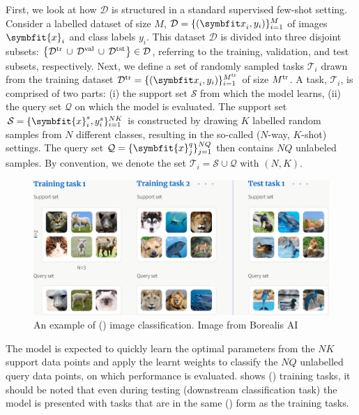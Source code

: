 First, we look at how \(\mathcal{D}\) is structured in a standard supervised few-shot setting. 
Consider a labelled dataset of size $M$, $\mathcal{D} = \{({\symbfit x}_i, y_i)\}_{i = 1}^{M}$ of images $\symbfit{x}_i$ and class labels $y_i$. 
This dataset $\mathcal{D}$ is divided into three disjoint subsets: $\left\{\mathcal{D}^\textup{tr}\, \cup\, \mathcal{D}^\textup{val}\, \cup\, \mathcal{D}^\textup{tst}\right\} \in \mathcal{D}$, referring to the training, validation, and test subsets, respectively.
Next, we define a set of randomly sampled tasks $\mathcal{T}_i$ drawn from the training dataset $\mathcal{D}^{\textup{tr}} = \{({\symbfit x}_i, y_i)\}_{i = 1}^{M^\textup{tr}}$ of size $M^\textup{tr}$. A task, $\mathcal{T}_i$, is comprised of two parts: (i) the support set $\mathcal{S}$ from which the model learns, (ii) the query set $\mathcal{Q}$ on which the model is evaluated. The support set $\mathcal{S}=\{\symbfit{x}^{s}_i, y^{s}_i\}_{i=1}^{NK}$ is constructed by drawing $K$ labelled random samples from $N$ different classes, resulting in the so-called ($N$-way, $K$-shot) settings.
The query set $\mathcal{Q}=\{\symbfit{x}^{q}_j\}_{j=1}^{NQ}$ then contains $NQ$ unlabeled samples. By convention, we denote the set $\mathcal{T}_i = \mathcal{S} \cup \mathcal{Q}$ with $(N, K)$.
\begin{figure}[ht]
    \centering
    \captionsetup{justification=centering}
    \includegraphics[width=\linewidth]{chapters/assets/fsl/n3k2.png}
    \caption{An example of () image classification. Image from Borealis AI\protect\footnotemark}
    \label{fig:fsl-tasks}
\end{figure}
The model is expected to quickly learn the optimal parameters from the $NK$ support data points and apply the learnt weights to classify the $NQ$ unlabelled query data points, on which performance is evaluated.
 shows () training tasks, it should be noted that even during testing (downstream classification task) the model is presented with tasks that are in the same () form as the training tasks.

